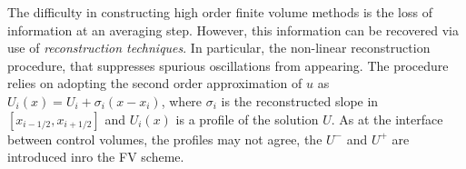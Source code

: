 \documentclass[11pt,a4paper,headinclude=true,DIV=14,BCOR=8mm,chapterprefix,listof=totoc,twoside,openright,abstracton]{scrbook}
\begin{document}
The difficulty in constructing high order finite volume methods is the loss of information at an averaging step. However, this information can be recovered via use of \textit{reconstruction techniques}. In particular, the non-linear reconstruction procedure, that suppresses spurious oscillations from appearing. The procedure relies on adopting the second order approximation of $u$ as $U_i(x) = U_i + \sigma_i(x-x_i)$, where $\sigma_i$ is the reconstructed slope in $[x_{i-1/2},x_{i+1/2}]$ and $U_i(x)$ is a profile of the solution $U$. As at the interface between control volumes, the profiles may not agree, the $U^{-}$ and $U^{+}$ are introduced inro the FV scheme.



\newpage


\end{document}
